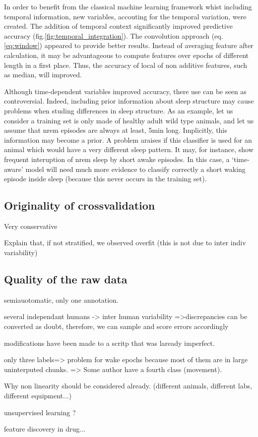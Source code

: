 In order to benefit from the classical machine learning 
framework whist including temporal information, new variables, accouting for the temporal variation, were created.
The addition of temporal context significantly improved predictive accuracy (fig.\ref{fig:temporal_integration}).
The convolution approach (eq.\ref{eq:window}) appeared to provide better results.
Instead of averaging feature after calculation, it may be advantageous to compute features over epochs of different length in a first place.
Thus, the accuracy of local of non additive features, such as median, will improved.


Although time-dependent variables improved accuracy, there use can be seen as controversial.
Indeed, including prior information about sleep structure may cause problems when studing differences in sleep structure.
As an example, let us consider a training set is only made of healthy adult wild type animals, 
and let us assume that \gls{nrem} episodes are always at least, 5min long.
Implicitly, this information may become a prior.
A problem araises if this classifier is used for an animal which would have a very different sleep pattern.
It may, for instance, show frequent interuption of  \gls{nrem} sleep by short awake episodes.
In this case, a `time-aware' model will need much more evidence to
classify correctly a short waking episode inside sleep (because this never occurs in the training set).


\subsection{Originality of crossvalidation} 

Very conservative

Explain that, if not stratified, we observed overfit (this is not due to inter indiv variability)


\subsection{Quality of the raw data} 
semiauotomatic, only one annotation.

several independant humans -> inter human variability
=>discrepancies can be converted as doubt, therefore, we can sample and score errors accordingly

modifications have been made to a scritp that was laready imperfect.

only three labels=> problem for wake epochs because most of them are in large uninterputed chunks.
=> Some author have a fourth class (movement).

Why non linearity should be considered already.
(different animals, different labs, different equipment...)

unsupervised learning ?

feature discovery in drug...
